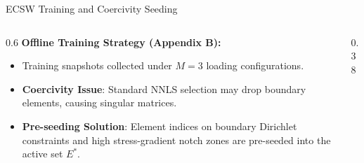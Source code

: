 \documentclass[aspectratio=169, 10pt]{beamer}
\begin{document}
\begin{frame}{ECSW Training and Coercivity Seeding}
    \begin{columns}
        \begin{column}{0.6\textwidth}
            \textbf{Offline Training Strategy (Appendix B):}
            \begin{itemize}
                \item Training snapshots collected under $M=3$ loading configurations.
                \item \textbf{Coercivity Issue}: Standard NNLS selection may drop boundary elements, causing singular matrices.
                \item \textbf{Pre-seeding Solution}: Element indices on boundary Dirichlet constraints and high stress-gradient notch zones are pre-seeded into the active set $E^*$.
            \end{itemize}
        \end{column}
        \begin{column}{0.38\textwidth}
            \centering
        \end{column}
    \end{columns}
\end{frame}
\end{document}
